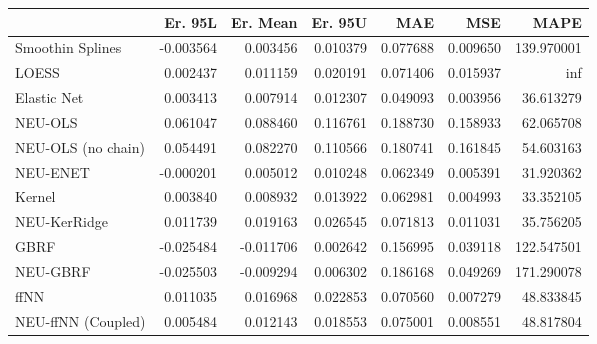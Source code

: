\begin{tabular}{lrrrrrr}
\toprule
{} &   Er. 95L &  Er. Mean &   Er. 95U &       MAE &       MSE &        MAPE \\
\midrule
Smoothin Splines   & -0.003564 &  0.003456 &  0.010379 &  0.077688 &  0.009650 &  139.970001 \\
LOESS              &  0.002437 &  0.011159 &  0.020191 &  0.071406 &  0.015937 &         inf \\
Elastic Net        &  0.003413 &  0.007914 &  0.012307 &  0.049093 &  0.003956 &   36.613279 \\
NEU-OLS            &  0.061047 &  0.088460 &  0.116761 &  0.188730 &  0.158933 &   62.065708 \\
NEU-OLS (no chain) &  0.054491 &  0.082270 &  0.110566 &  0.180741 &  0.161845 &   54.603163 \\
NEU-ENET           & -0.000201 &  0.005012 &  0.010248 &  0.062349 &  0.005391 &   31.920362 \\
Kernel             &  0.003840 &  0.008932 &  0.013922 &  0.062981 &  0.004993 &   33.352105 \\
NEU-KerRidge       &  0.011739 &  0.019163 &  0.026545 &  0.071813 &  0.011031 &   35.756205 \\
GBRF               & -0.025484 & -0.011706 &  0.002642 &  0.156995 &  0.039118 &  122.547501 \\
NEU-GBRF           & -0.025503 & -0.009294 &  0.006302 &  0.186168 &  0.049269 &  171.290078 \\
ffNN               &  0.011035 &  0.016968 &  0.022853 &  0.070560 &  0.007279 &   48.833845 \\
NEU-ffNN (Coupled) &  0.005484 &  0.012143 &  0.018553 &  0.075001 &  0.008551 &   48.817804 \\
\bottomrule
\end{tabular}
